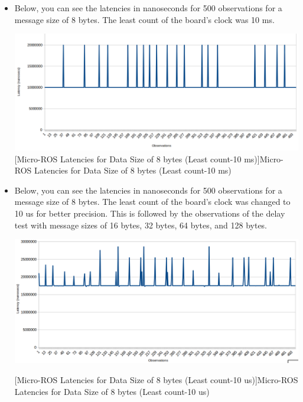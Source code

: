 \documentclass[%
xelatex,
	oneside,		%
	12pt,			%
	parskip=half,	%
	abstracton,
	chapterprefix=true%
    appendixprefix=true]
{scrbook}
\begin{document}
\begin{itemize}
\item Below, you can see the latencies in nanoseconds for 500 observations for a message size of 8 bytes. The least count of the board's clock was 10 ms.

\begin{center}
\includegraphics[scale=0.3]{fig/uros8byteles.png}
[Micro-ROS Latencies for Data Size of 8 bytes (Least count-10 ms)]{Micro-ROS Latencies for Data Size of 8 bytes (Least count-10 ms)}
\label{fig:uros8byteles}
\end{center}

\item Below, you can see the latencies in nanoseconds for 500 observations for a message size of 8 bytes. The least count of the board's clock was changed to 10 us for better precision. This is followed by the observations of the delay test with message sizes of 16 bytes, 32 bytes, 64 bytes, and 128 bytes.
\begin{center}
\includegraphics[scale=0.32]{fig/uros8byte.png}

[Micro-ROS Latencies for Data Size of 8 bytes (Least count-10 us)]{Micro-ROS Latencies for Data Size of 8 bytes (Least count-10 us)}
\label{fig:uros8byte}
\end{center}



\end{itemize}
\end{document}
